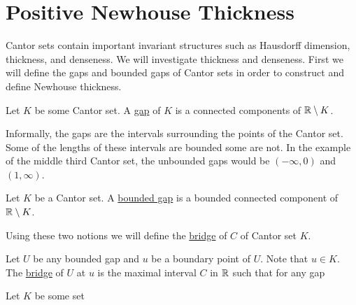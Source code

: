 \section{Positive Newhouse Thickness}
Cantor sets contain important invariant structures such as Hausdorff dimension, thickness, and denseness.  We will investigate thickness and denseness.  First we will define the gaps and bounded gaps of Cantor sets in order to construct and define Newhouse thickness. 
\begin{definition}[Gap]
    Let $K$ be some Cantor set.  A \underline{gap} of $K$ is a connected components of $\mathbb{R} \setminus K$.      
\end{definition}  Informally, the gaps are the intervals surrounding the points of the Cantor set.  Some of the lengths of these intervals are bounded some are not.  In the example of the middle third Cantor set, the unbounded gaps would be $(-\infty, 0)$ and $(1, \infty)$.  

\begin{definition}
    Let $K$ be a Cantor set.  A \underline{bounded gap} is a bounded connected component of $\mathbb{R} \setminus K$.      
\end{definition}

Using these two notions we will define the \underline{bridge} of $C$ of Cantor set $K$.  
\begin{definition}[bridge]\cite{palis&takens}
    Let $U$ be any bounded gap and $u$ be a boundary point of $U$.  Note that $u \in K$.  The \underline{bridge}  of $U$ at $u$ is the maximal interval $C$ in $\mathbb{R}$ such that for any gap 
\end{definition}

\begin{definition}\cite{palis&takens}
    Let $K$ be some set 
    
\end{definition}


